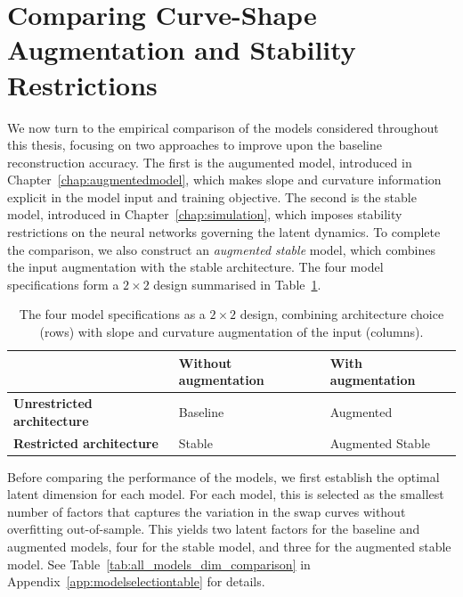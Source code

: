 
\section{Comparing Curve-Shape Augmentation and Stability Restrictions}
\label{sec:comparing_model_modifications}

We now turn to the empirical comparison of the models considered throughout this thesis, focusing on two approaches to improve upon the baseline reconstruction accuracy. The first is the augumented model, introduced in Chapter~\ref{chap:augmentedmodel}, which makes slope and curvature information explicit in the model input and training objective. The second is the stable model, introduced in Chapter~\ref{chap:simulation}, which imposes stability restrictions on the neural networks governing the latent dynamics. To complete the comparison, we also construct an \textit{augmented stable} model, which combines the input augmentation with the stable architecture. The four model specifications form a $2\times 2$ design summarised in Table~\ref{tab:variants_2x2}.

\begin{table}[H]
\centering
\small
\begin{tabular}{@{}lll@{}}
\toprule
& \textbf{Without augmentation} & \textbf{With augmentation} \\
\midrule
\textbf{Unrestricted architecture} & Baseline & Augmented \\
\textbf{Restricted architecture}       & Stable   & Augmented Stable \\
\bottomrule
\end{tabular}
\caption{The four model specifications as a $2\times2$ design, combining architecture choice (rows) with slope and curvature augmentation of the input (columns).}
\label{tab:variants_2x2}
\end{table}

Before comparing the performance of the models, we first establish the optimal latent dimension for each model. For each model, this is selected as the smallest number of factors that captures the variation in the swap curves without overfitting out-of-sample. This yields two latent factors for the baseline and augmented models, four for the stable model, and three for the augmented stable model. See Table~\ref{tab:all_models_dim_comparison} in Appendix~\ref{app:modelselectiontable} for details.




